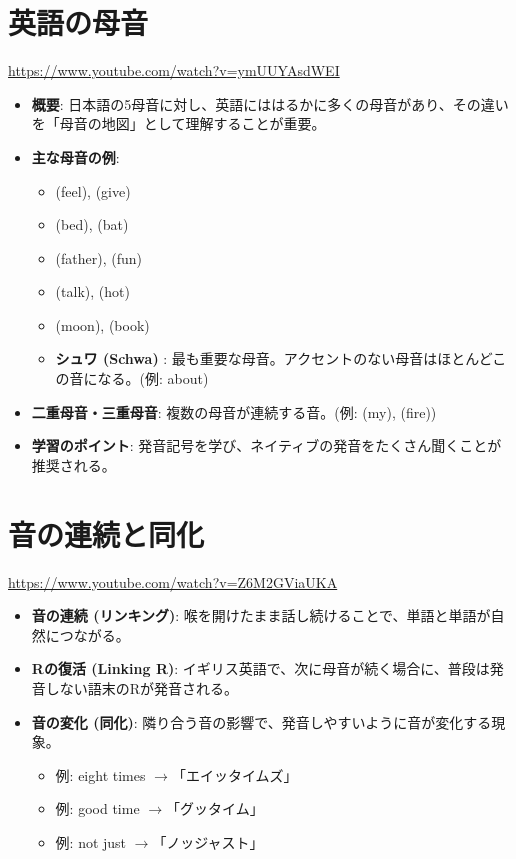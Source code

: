 \documentclass{jlreq}
\begin{document}
\section{英語の母音}
\href{https://www.youtube.com/watch?v=ymUUYAsdWEI}{https://www.youtube.com/watch?v=ymUUYAsdWEI}
\begin{itemize}
    \item \textbf{概要}: 日本語の5母音に対し、英語にははるかに多くの母音があり、その違いを「母音の地図」として理解することが重要。
    \item \textbf{主な母音の例}:
    \begin{itemize}
        \item \textipa{[i:]} (feel), \textipa{[I]} (give)
        \item \textipa{[e]} (bed), \textipa{[\ae]} (bat)
        \item \textipa{[A:]} (father), \textipa{[\textturnv ]} (fun)
        \item \textipa{[\textopeno:]} (talk), \textipa{[\textsci]} (hot)
        \item \textipa{[u:]} (moon), \textipa{[\textupsilon]} (book)
        \item \textbf{シュワ (Schwa) \textipa{[\textschwa]}}: 最も重要な母音。アクセントのない母音はほとんどこの音になる。(例: about)
    \end{itemize}
    \item \textbf{二重母音・三重母音}: 複数の母音が連続する音。(例: \textipa{[aI]} (my), \textipa{[aI\textschwa]} (fire))
    \item \textbf{学習のポイント}: 発音記号を学び、ネイティブの発音をたくさん聞くことが推奨される。
\end{itemize}

\section{音の連続と同化}
\href{https://www.youtube.com/watch?v=Z6M2GViaUKA}{https://www.youtube.com/watch?v=Z6M2GViaUKA}
\begin{itemize}
    \item \textbf{音の連続 (リンキング)}: 喉を開けたまま話し続けることで、単語と単語が自然につながる。
    \item \textbf{Rの復活 (Linking R)}: イギリス英語で、次に母音が続く場合に、普段は発音しない語末のRが発音される。
    \item \textbf{音の変化 (同化)}: 隣り合う音の影響で、発音しやすいように音が変化する現象。
    \begin{itemize}
        \item 例: eight times $\to$「エイッタイムズ」
        \item 例: good time $\to$「グッタイム」
        \item 例: not just $\to$「ノッジャスト」
    \end{itemize}
\end{itemize}
\end{document}
